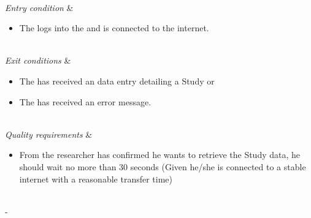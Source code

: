 \begin{table}[H]
\begin{tabu}
\begin{enumerate}[leftmargin=*,topsep=0pt,itemsep=-1ex]
	\end{enumerate} \\
	\hline
	\textit{Entry condition} &
	\vspace{-3mm}
	\begin{itemize}[leftmargin=*,topsep=0pt,itemsep=-1ex]
		\item The \client logs into the \client and is connected to the internet.
	\end{itemize} \\
	\hline
	\textit{Exit conditions} &
	\vspace{-3mm}
	\begin{itemize}[leftmargin=*,topsep=0pt,itemsep=-1ex]
		\item The \client has received an data entry detailing a Study or
		\item The \client has received an error message.
	\end{itemize} \\
	\hline
	\textit{Quality \newline requirements} &
	\vspace{-3mm}
	\begin{itemize}[leftmargin=*,topsep=0pt,itemsep=-1ex]
		\item From the researcher has confirmed he wants to retrieve the Study data,  he should wait no more than 30 seconds (Given he/she is connected to a stable internet with a reasonable transfer time)
	\end{itemize} \\
	\tabucline[1.5pt]-
\end{tabu}
\caption{Use case: RetrieveStudyInformation}
\label{uc:RetrieveStudyInformation}
\end{table}